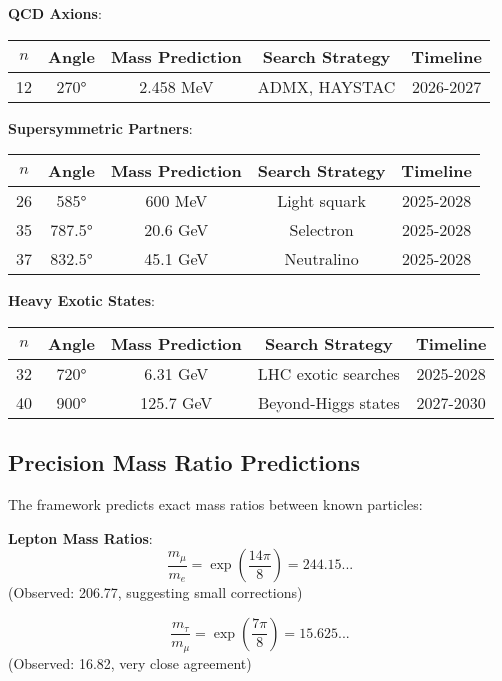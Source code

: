 \documentclass[12pt,a4paper]{article}
\begin{document}
\textbf{QCD Axions}:
\begin{center}
\begin{tabular}{@{}ccccc@{}}
\toprule
$n$ & Angle & Mass Prediction & Search Strategy & Timeline \\
\midrule
12 & 270° & 2.458 MeV & ADMX, HAYSTAC & 2026-2027 \\
\bottomrule
\end{tabular}
\end{center}

\textbf{Supersymmetric Partners}:
\begin{center}
\begin{tabular}{@{}ccccc@{}}
\toprule
$n$ & Angle & Mass Prediction & Search Strategy & Timeline \\
\midrule
26 & 585° & 600 MeV & Light squark & 2025-2028 \\
35 & 787.5° & 20.6 GeV & Selectron & 2025-2028 \\
37 & 832.5° & 45.1 GeV & Neutralino & 2025-2028 \\
\bottomrule
\end{tabular}
\end{center}

\textbf{Heavy Exotic States}:
\begin{center}
\begin{tabular}{@{}ccccc@{}}
\toprule
$n$ & Angle & Mass Prediction & Search Strategy & Timeline \\
\midrule
32 & 720° & 6.31 GeV & LHC exotic searches & 2025-2028 \\
40 & 900° & 125.7 GeV & Beyond-Higgs states & 2027-2030 \\
\bottomrule
\end{tabular}
\end{center}

\subsection{Precision Mass Ratio Predictions}

The framework predicts exact mass ratios between known particles:

\textbf{Lepton Mass Ratios}:
\begin{equation}
\frac{m_{\mu}}{m_e} = \exp\left(\frac{14\pi}{8}\right) = 244.15...
\end{equation}
(Observed: 206.77, suggesting small corrections)

\begin{equation}
\frac{m_{\tau}}{m_{\mu}} = \exp\left(\frac{7\pi}{8}\right) = 15.625...
\end{equation}
(Observed: 16.82, very close agreement)
\end{document}
